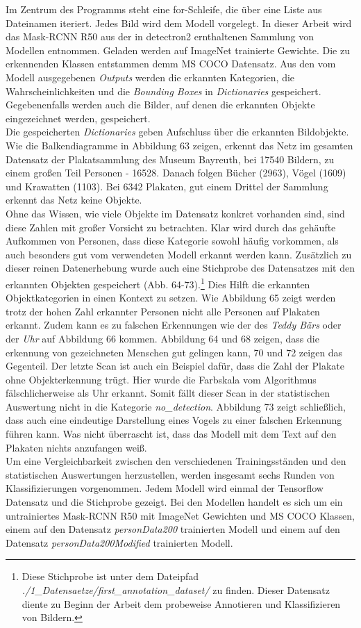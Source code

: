 \documentclass[a4paper,12pt,ngerman]{article}
\begin{document}
Im Zentrum des Programms steht eine for-Schleife, die über eine Liste aus Dateinamen iteriert. Jedes Bild wird dem Modell vorgelegt. In dieser Arbeit wird das Mask-RCNN R50 aus der in detectron2 ernthaltenen Sammlung von Modellen entnommen. Geladen werden auf ImageNet trainierte Gewichte. Die zu erkennenden Klassen entstammen demm MS COCO Datensatz. Aus den vom Modell ausgegebenen \textit{Outputs} werden die erkannten Kategorien, die Wahrscheinlichkeiten und die \textit{Bounding Boxes} in \textit{Dictionaries} gespeichert. Gegebenenfalls werden auch die Bilder, auf denen die erkannten Objekte eingezeichnet werden, gespeichert. \\
Die gespeicherten \textit{Dictionaries} geben Aufschluss über die erkannten Bildobjekte. Wie die Balkendiagramme in Abbildung 63 zeigen, erkennt das Netz im gesamten Datensatz der Plakatsammlung des Museum Bayreuth, bei 17540 Bildern, zu einem großen Teil Personen - 16528. Danach folgen Bücher (2963), Vögel (1609) und Krawatten (1103). Bei 6342 Plakaten, gut einem Drittel der Sammlung erkennt das Netz keine Objekte. \\
Ohne das Wissen, wie viele Objekte im Datensatz konkret vorhanden sind, sind diese Zahlen mit großer Vorsicht zu betrachten. Klar wird durch das gehäufte Aufkommen von Personen, dass diese Kategorie sowohl häufig vorkommen, als auch besonders gut vom verwendeten Modell erkannt werden kann. Zusätzlich zu dieser reinen Datenerhebung wurde auch eine Stichprobe des Datensatzes mit den erkannten Objekten gespeichert (Abb. 64-73).\footnote{Diese Stichprobe ist unter dem Dateipfad \textit{./1\_Datensaetze/first\_annotation\_dataset/} zu finden. Dieser Datensatz diente zu Beginn der Arbeit dem probeweise Annotieren und Klassifizieren von Bildern.} Dies Hilft die erkannten Objektkategorien in einen Kontext zu setzen. Wie Abbildung 65 zeigt werden trotz der hohen Zahl erkannter Personen nicht alle Personen auf Plakaten erkannt. Zudem kann es zu falschen Erkennungen wie der des \textit{Teddy Bärs} oder der \textit{Uhr} auf Abbildung 66 kommen. Abbildung 64 und 68 zeigen, dass die erkennung von gezeichneten Menschen gut gelingen kann, 70 und 72 zeigen das Gegenteil. Der letzte Scan ist auch ein Beispiel dafür, dass die Zahl der Plakate ohne Objekterkennung trügt. Hier wurde die Farbskala vom Algorithmus fälschlicherweise als Uhr erkannt. Somit fällt dieser Scan in der statistischen Auswertung nicht in die Kategorie \textit{no\_detection}. Abbildung 73 zeigt schließlich, dass auch eine eindeutige Darstellung eines Vogels zu einer falschen Erkennung führen kann. Was nicht überrascht ist, dass das Modell mit dem Text auf den Plakaten nichts anzufangen weiß. \\
Um eine Vergleichbarkeit zwischen den verschiedenen Trainingsständen und den statistischen Auswertungen herzustellen, werden insgesamt sechs Runden von Klassifizierungen vorgenommen. Jedem Modell wird einmal der Tensorflow Datensatz und die Stichprobe gezeigt. Bei den Modellen handelt es sich um ein untrainiertes Mask-RCNN R50 mit ImageNet Gewichten und MS COCO Klassen, einem auf den Datensatz \textit{personData200} trainierten Modell und einem auf den Datensatz \textit{personData200Modified} trainierten Modell. \\
\end{document}
